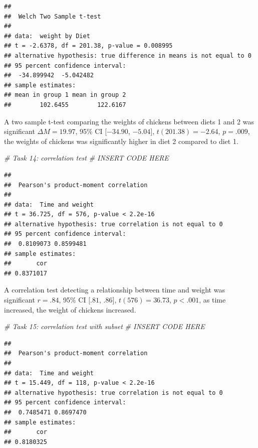 \documentclass[english,man]{apa6}
\newenvironment{Shaded}{\begin{snugshade}}{\end{snugshade}}
\newcommand{\CommentTok}[1]{\textcolor[rgb]{0.56,0.35,0.01}{\textit{{#1}}}}
\begin{document}
\begin{verbatim}
## 
##  Welch Two Sample t-test
## 
## data:  weight by Diet
## t = -2.6378, df = 201.38, p-value = 0.008995
## alternative hypothesis: true difference in means is not equal to 0
## 95 percent confidence interval:
##  -34.899942  -5.042482
## sample estimates:
## mean in group 1 mean in group 2 
##        102.6455        122.6167
\end{verbatim}

A two sample t-test comparing the weights of chickens between diets 1
and 2 was significant \(\Delta M = 19.97\), 95\% CI \([-34.90\),
\(-5.04]\), \(t(201.38) = -2.64\), \(p = .009\), the weights of chickens
was significantly higher in diet 2 compared to diet 1.

\begin{Shaded}
\begin{Highlighting}[]
\CommentTok{# Task 14: correlation test}
\CommentTok{# INSERT CODE HERE}
\end{Highlighting}
\end{Shaded}

\begin{verbatim}
## 
##  Pearson's product-moment correlation
## 
## data:  Time and weight
## t = 36.725, df = 576, p-value < 2.2e-16
## alternative hypothesis: true correlation is not equal to 0
## 95 percent confidence interval:
##  0.8109073 0.8599481
## sample estimates:
##       cor 
## 0.8371017
\end{verbatim}

A correlation test detecting a relationship between time and weight was
significant \(r = .84\), 95\% CI \([.81\), \(.86]\), \(t(576) = 36.73\),
\(p < .001\), as time increased, the weight of chickens increased.

\begin{Shaded}
\begin{Highlighting}[]
\CommentTok{# Task 15: correlation test with subset}
\CommentTok{# INSERT CODE HERE}
\end{Highlighting}
\end{Shaded}

\begin{verbatim}
## 
##  Pearson's product-moment correlation
## 
## data:  Time and weight
## t = 15.449, df = 118, p-value < 2.2e-16
## alternative hypothesis: true correlation is not equal to 0
## 95 percent confidence interval:
##  0.7485471 0.8697470
## sample estimates:
##       cor 
## 0.8180325
\end{verbatim}
\end{document}
